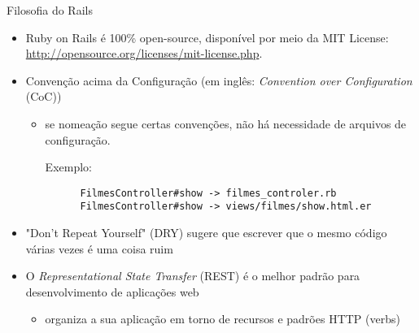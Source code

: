 \begin{frame}{Filosofia do Rails}
  \begin{itemize}
    \item Ruby on Rails é 100\% open-source, disponível por meio da MIT License:
      \url{http://opensource.org/licenses/mit-license.php}.  
    \item \alert{Convenção} acima da Configuração (em inglês: \textit{Convention over Configuration} (CoC))
    \begin{itemize}
	\item se nomeação segue certas convenções, não há necessidade de arquivos de configuração.
	\begin{exampleblock}{Exemplo:}
	  \begin{verbatim}
      FilmesController#show -> filmes_controler.rb 
      FilmesController#show -> views/filmes/show.html.er
    \end{verbatim}
	\end{exampleblock}
    \end{itemize}
    \item \alert{"Don't Repeat Yourself"} (DRY) sugere que escrever que o mesmo código várias 
      vezes é uma coisa ruim
    
    \item O \textit{Representational State Transfer} (REST) é o melhor padrão para desenvolvimento de aplicações web
    \begin{itemize}
     \item organiza a sua aplicação em torno de \alert{recursos} e \alert{padrões} HTTP (verbs)
    \end{itemize}
  \end{itemize}   
\end{frame}
